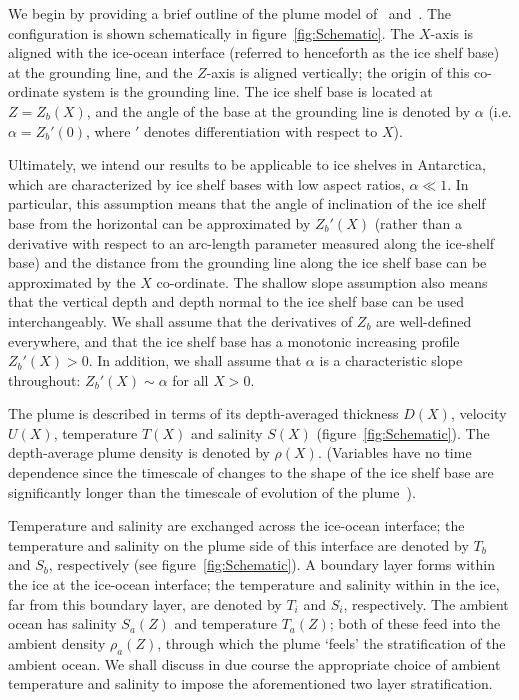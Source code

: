 \documentclass[openacc]{rsproca_new}%
\begin{document}
We begin by providing a brief outline of the plume model of~\cite{Jenkins1991JGeophysResOceans} and~\cite{Jenkins2011JPhysOcean}. The configuration is shown schematically in figure~\ref{fig:Schematic}. The $X$-axis is aligned with the ice-ocean interface (referred to henceforth as the ice shelf base) at the grounding line, and the $Z$-axis is aligned vertically; the origin of this co-ordinate system is the grounding line. The ice shelf base is located at $Z = Z_b(X)$, and the angle of the base at the grounding line is denoted by $\alpha$ (i.e. $\alpha = Z_b'(0)$, where $'$ denotes differentiation with respect to $X$).

Ultimately, we intend our results to  be applicable to ice shelves in Antarctica, which are characterized by ice shelf bases with low aspect ratios, $\alpha \ll 1$. In particular, this assumption means that the angle of inclination of the ice shelf base from the horizontal can be approximated by $Z_b'(X)$ (rather than a derivative with respect to an arc-length parameter measured along the ice-shelf base) and the distance from the grounding line along the ice shelf base can be approximated by the $X$ co-ordinate. The shallow slope assumption also means that the vertical depth and depth normal to the ice shelf base can be used interchangeably. We shall assume that the derivatives of $Z_b$ are well-defined everywhere, and that the ice shelf base has a monotonic increasing profile $Z_b'(X) >0$. In addition, we shall assume that $\alpha$ is a characteristic slope throughout: $Z_b'(X)\sim \alpha$ for all $X >0$. 

The plume is described in terms of its depth-averaged thickness $D(X)$, velocity $U(X)$, temperature $T(X)$ and salinity $S(X)$ (figure~\ref{fig:Schematic}). The depth-average plume density is denoted by $\rho(X)$. (Variables have no time dependence since the timescale of changes to the shape of the ice shelf base are significantly longer than the timescale of evolution of the plume~\citep{Hewitt2020AnnRevFlu}).  

Temperature and salinity are exchanged across the ice-ocean interface; the temperature and salinity on the plume side of this interface are denoted by $T_b$ and $S_b$, respectively (see figure~\ref{fig:Schematic}). A boundary layer forms within the ice at the ice-ocean interface; the temperature and salinity within in the ice, far from this boundary layer, are denoted by $T_i$ and $S_i$, respectively. The ambient ocean has salinity $S_a(Z)$ and temperature $T_a(Z)$; both of these feed into the ambient density $\rho_a(Z)$, through which the plume `feels' the stratification of the ambient ocean.  We shall discuss in due course the appropriate choice of ambient temperature and salinity to impose the aforementioned two layer stratification. 
\end{document}
